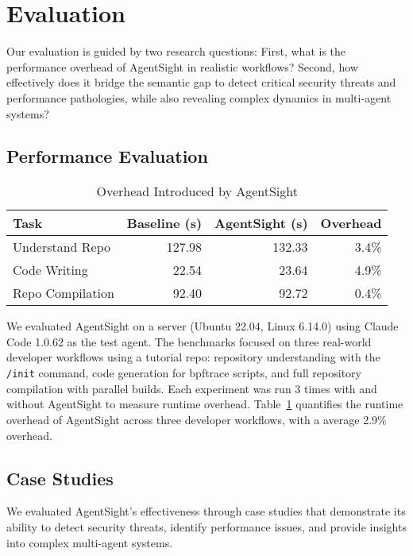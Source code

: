 \section{Evaluation}

Our evaluation is guided by two research questions: First, what is the performance overhead of AgentSight in realistic workflows? Second, how effectively does it bridge the semantic gap to detect critical security threats and performance pathologies, while also revealing complex dynamics in multi-agent systems?

\subsection{Performance Evaluation}

\begin{table}[h]
\centering
\caption{Overhead Introduced by AgentSight}
\label{tab:build-overhead}
\begin{tabular}{lrrr}
\toprule
Task & Baseline (s) & AgentSight (s) & Overhead \\
\midrule
Understand Repo & 127.98 & 132.33 & 3.4\% \\
Code Writing & 22.54 & 23.64 & 4.9\% \\
Repo Compilation & 92.40 & 92.72 & 0.4\% \\
\bottomrule
\end{tabular}
\end{table}

 We evaluated AgentSight on a server (Ubuntu 22.04, Linux 6.14.0) using Claude Code 1.0.62 as the test agent. The benchmarks focused on three real-world developer workflows using a tutorial repo\cite{ebpftutorial}: repository understanding with the \texttt{/init} command, code generation for bpftrace scripts, and full repository compilation with parallel builds. Each experiment was run 3 times with and without AgentSight to measure runtime overhead.
Table~\ref{tab:build-overhead} quantifies the runtime overhead of AgentSight across three developer workflows, with a average 2.9\% overhead.  

\subsection{Case Studies}

We evaluated AgentSight's effectiveness through case studies that demonstrate its ability to detect security threats, identify performance issues, and provide insights into complex multi-agent systems.

